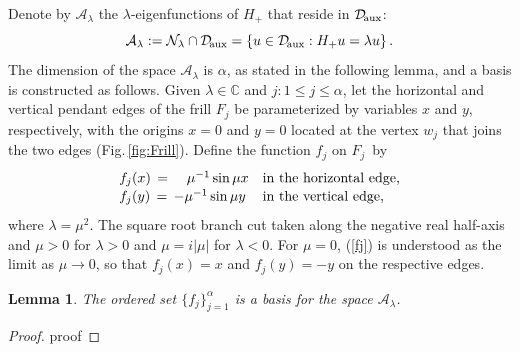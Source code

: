 \documentclass[12pt]{article}
\newtheorem{lemma}[theorem]{Lemma}
\newcommand{\CC}{\mathbb{C}}
\newcommand{\Daux}{\mathcal{D}_\text{\!aux}}
\newcommand{\Nlambda}{{\mathcal N}_\lambda}
\newcommand{\Alambda}{{\mathcal A}_\lambda}
\begin{document}
Denote by $\Alambda$ the $\lambda$-eigenfunctions of $H_+$ that reside in $\Daux$:
%
\begin{equation}
  \Alambda := \Nlambda \cap \Daux
                   = \left\{ u\in\Daux : H_+u = \lambda u \right\}.
\end{equation}
%
The dimension of the space $\Alambda$ is $\alpha$, as stated in the following lemma, and a basis is constructed as follows.
  Given $\lambda\in\CC$ and $j:1\leq j\leq\alpha$, let the horizontal and vertical pendant edges of the frill $F_j$ be parameterized by variables $x$ and $y$, respectively, with the origins $x=0$ and $y=0$ located at the vertex $w_j$ that joins the two edges (Fig.\,\ref{fig:Frill}).  Define the function $f_j$ on $F_j$~by
%
\begin{equation}\label{fj}
  \renewcommand{\arraystretch}{1.1}
\left.
\begin{array}{ll}
    f_j(x) \,=\, \hspace{9pt}\mu^{-1} \sin \mu x  & \text{in the horizontal edge,} \\
    f_j(y) \,=\, - \mu^{-1} \sin \mu y  & \text{in the vertical edge,}
\end{array}
\right.
\end{equation}
%
where $\lambda=\mu^2$.  The square root branch cut taken along the negative real half-axis and $\mu>0$ for $\lambda>0$ and $\mu=i|\mu|$ for $\lambda<0$.  For $\mu=0$, (\ref{fj}) is understood as the limit as $\mu\to0$, so that $f_j(x)=x$ and $f_j(y)=-y$ on the respective edges. 

\begin{lemma}\label{lemma:Alambda}  %
The ordered set
%
  $\{ f_j \}_{j=1}^\alpha$
%
is a basis for the space $\Alambda$.
\end{lemma}

\begin{proof}
  proof
\end{proof}
\end{document}
